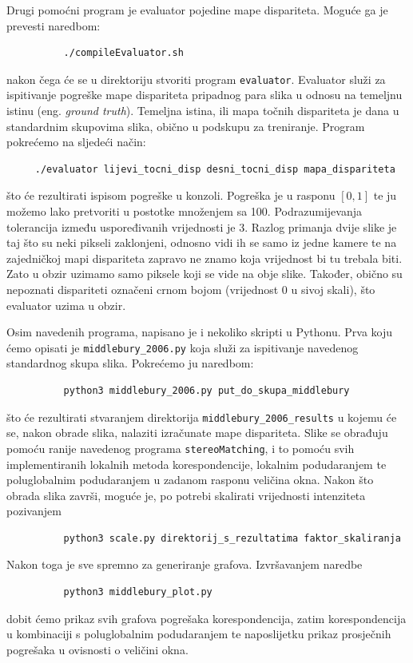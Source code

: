 \documentclass[utf8, zavrsni, numeric]{fer}
\begin{document}
Drugi pomoćni program je evaluator pojedine mape dispariteta. Moguće ga je prevesti naredbom:
\begin{verbatim}
          ./compileEvaluator.sh
\end{verbatim}
nakon čega će se u direktoriju stvoriti program {\tt evaluator}. Evaluator služi za ispitivanje
pogreške mape dispariteta pripadnog para slika u odnosu na temeljnu istinu (eng. {\sl ground truth}). Temeljna istina, ili mapa točnih dispariteta je dana u standardnim skupovima slika, 
obično u podskupu za treniranje. Program pokrećemo na sljedeći način:
\begin{verbatim}
     ./evaluator lijevi_tocni_disp desni_tocni_disp mapa_dispariteta
\end{verbatim}
što će rezultirati ispisom pogreške u konzoli. Pogreška je u rasponu $[0, 1]$ te ju možemo lako pretvoriti u postotke množenjem sa 100. Podrazumijevanja tolerancija između uspoređivanih vrijednosti je 3. Razlog primanja dvije slike je taj što su neki
pikseli zaklonjeni, odnosno vidi ih se samo iz jedne kamere te na zajedničkoj mapi dispariteta
zapravo ne znamo koja vrijednost bi tu trebala biti. Zato u obzir uzimamo samo piksele koji se vide na obje slike.
Također, obično su nepoznati dispariteti označeni crnom bojom (vrijednost 0 u sivoj skali), što evaluator uzima u obzir.

Osim navedenih programa, napisano je i nekoliko skripti u Pythonu. Prva koju ćemo opisati je
{\verb|middlebury_2006.py|} koja služi za ispitivanje navedenog standardnog skupa slika.
Pokrećemo ju naredbom:
\begin{verbatim}
          python3 middlebury_2006.py put_do_skupa_middlebury
\end{verbatim}
što će rezultirati stvaranjem direktorija {\verb|middlebury_2006_results|} u kojemu će se, nakon
obrade slika, nalaziti izračunate mape dispariteta. Slike se obrađuju pomoću ranije navedenog
programa {\verb|stereoMatching|}, i to pomoću svih implementiranih lokalnih metoda korespondencije, lokalnim
podudaranjem te poluglobalnim podudaranjem u zadanom rasponu veličina okna.
Nakon što obrada slika završi, moguće je, po potrebi skalirati vrijednosti intenziteta
pozivanjem
\begin{verbatim}
          python3 scale.py direktorij_s_rezultatima faktor_skaliranja
\end{verbatim}

Nakon toga je sve spremno za generiranje grafova. Izvršavanjem naredbe
\begin{verbatim}
          python3 middlebury_plot.py
\end{verbatim}
dobit ćemo prikaz svih grafova pogrešaka korespondencija, zatim korespondencija u kombinaciji
s poluglobalnim podudaranjem te naposlijetku prikaz prosječnih pogrešaka u ovisnosti o
veličini okna.
\end{document}
